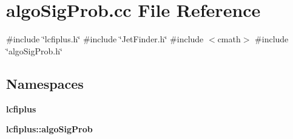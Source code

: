 \section{algo\+Sig\+Prob.\+cc File Reference}
\label{algoSigProb_8cc}
{\ttfamily \#include \char`\"{}lcfiplus.\+h\char`\"{}}\newline
{\ttfamily \#include \char`\"{}Jet\+Finder.\+h\char`\"{}}\newline
{\ttfamily \#include $<$cmath$>$}\newline
{\ttfamily \#include \char`\"{}algo\+Sig\+Prob.\+h\char`\"{}}\newline
\subsection*{Namespaces}
\begin{DoxyCompactItemize}
\item 
 \textbf{ lcfiplus}
\item 
 \textbf{ lcfiplus\+::algo\+Sig\+Prob}
\end{DoxyCompactItemize}
